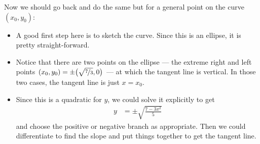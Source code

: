 \begin{eg}
Now we should go back and do the same but for a general point on the curve
$(x_0,y_0)$:
\begin{itemize}
  \item A good first step here is to sketch the curve. Since this is an
ellipse, it is pretty straight-forward.
 \item Notice that there are two points on the ellipse --- the extreme right
and left points  $(x_0,y_0)=\pm\big(\sqrt{\nicefrac{7}{3}},0\big)$ --- at
which the tangent line is vertical. In those two cases, the tangent line is
just $x=x_0$.


\item Since this is a quadratic for $y$, we could solve it explicitly to get
\begin{align*}
y &= \pm \sqrt{\frac{7-3x^2}{5}}
\end{align*}
and choose the positive or negative branch as appropriate. Then we could
differentiate to find the slope and put things together to get the tangent line.



\end{itemize}
\end{eg}

